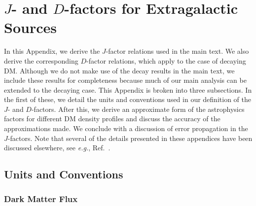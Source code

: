 
\chapter{$J$- and $D$-factors for Extragalactic Sources}
\label{app:JDrelations}

In this Appendix, we derive the $J$-factor relations used in the main text. We also derive the corresponding $D$-factor relations, which apply to the case of decaying DM.  Although we do not make use of the decay results in the main text, we include these results for completeness because much of our main analysis can be extended to the decaying case.
This Appendix is broken into three subsections. In the first of these, we detail the units and conventions used in our definition of the $J$- and $D$-factors.  After this, we derive an approximate form of the astrophysics factors for different DM density profiles and discuss the accuracy of the approximations made.  We conclude with a discussion of error propagation in the $J$-factors.  Note that several of the details presented in these appendices have been discussed elsewhere, see \emph{e.g.}, Ref.~\cite{Abdo:2010ex,Charbonnier:2011ft,Charbonnier:2012gf,Evans:2016xwx}. 

\section{Units and Conventions}

\subsection{Dark Matter Flux}

